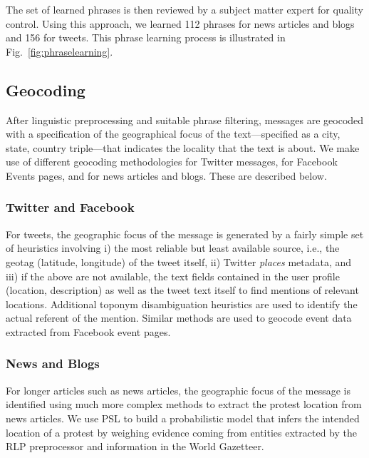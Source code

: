 \documentclass[letterpaper]{article}
\begin{document}
The set of learned phrases is then reviewed by a subject matter expert for quality control.  
Using this approach, we learned 112 phrases for news articles and blogs and 156 for tweets.  
This phrase learning process is illustrated in Fig.~\ref{fig:phraselearning}.

\begin{figure*}
  \centering
\caption{An example of phrase learning for detecting planned protests.}
\label{fig:phraselearning}
\end{figure*}

\subsection{Geocoding}
\label{subsection:geocoding}
After linguistic preprocessing and suitable phrase filtering,
messages are geocoded with a
specification of the geographical focus of the text---specified as a
city, state, country triple---that indicates the locality that the
text is about. We make use of different geocoding methodologies
for Twitter messages, for Facebook Events pages, and for news articles and blogs.
These are described below.

\subsubsection{Twitter and Facebook}
For tweets, the geographic focus of the message is generated by a fairly simple
set of heuristics involving i) the most reliable but least available
source, i.e., the geotag (latitude, longitude) of the tweet itself, ii)
Twitter {\it places} metadata, and iii) if the above are not available,
the text fields contained in the user profile (location, description) as
well as the tweet text itself to find mentions of relevant locations.
Additional toponym disambiguation heuristics are used to identify the
actual referent of the mention.  Similar methods are used to geocode
event data extracted from Facebook event pages.  

\subsubsection{News and Blogs}
For longer articles such as news articles, the geographic focus of the message
is identified using much more complex methods to extract the protest
location from news articles. We use PSL to build a probabilistic model
that infers the intended location of a protest by weighing evidence
coming from entities extracted by the RLP preprocessor and information in the World
Gazetteer. 
\end{document}
